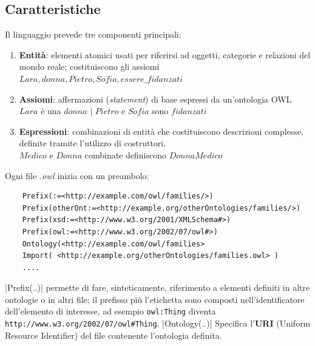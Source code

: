 \subsection{Caratteristiche}
Il linguaggio prevede tre componenti principali:
\begin{enumerate}
	\item \textbf{Entità}: elementi atomici usati per riferirsi ad oggetti, categorie e relazioni 
	del mondo reale; costituiscono gli assiomi\\ 
	$Lara,donna,Pietro,Sofia,essere\_fidanzati$ 
	\item \textbf{Assiomi}: affermazioni (\textit{statement}) di base espressi da un'ontologia OWL
	$Lara$ è una $donna$ | $ Pietro $ e $ Sofia $ sono $ fidanzati $
	\item \textbf{Espressioni}: combinazioni di entità che costituiscono descrizioni complesse, definite
	tramite l'utilizzo di costruttori. \\
	$ Medico $ e $ Donna $ combinate definiscono $ Donna Medico $ 
\end{enumerate}
 
Ogni file \textit{.owl} inizia con un preambolo: \label{code:preambolo}
\begin{verbatim} 
	Prefix(:=<http://example.com/owl/families/>)
	Prefix(otherOnt:=<http://example.org/otherOntologies/families/>)
	Prefix(xsd:=<http://www.w3.org/2001/XMLSchema#>)
	Prefix(owl:=<http://www.w3.org/2002/07/owl#>)
	Ontology(<http://example.com/owl/families>
	Import( <http://example.org/otherOntologies/families.owl> )
	....
\end{verbatim} 
|Prefix(..)| permette di fare, sinteticamente, riferimento a elementi definiti in altre ontologie o in altri file; il prefisso più l'etichetta sono composti nell'identificatore dell'elemento di interesse, ad esempio
\texttt{owl:Thing} diventa \texttt{http://www.w3.org/2002/07/owl#Thing}.
|Ontology(..)| Specifica l'\textbf{URI} (Uniform Resource Identifier) del file contenente l'ontologia definita.
